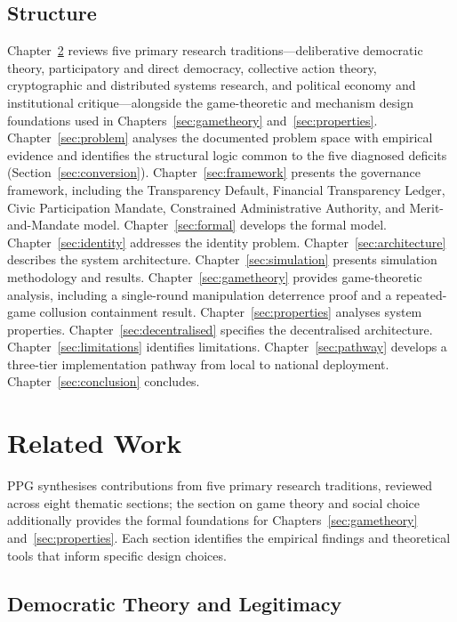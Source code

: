 \documentclass[12pt,a4paper,oneside]{report}
\begin{document}
\section{Structure}

Chapter~\ref{sec:related} reviews five primary research traditions---deliberative democratic theory, participatory and direct democracy, collective action theory, cryptographic and distributed systems research, and political economy and institutional critique---alongside the game-theoretic and mechanism design foundations used in Chapters~\ref{sec:gametheory} and~\ref{sec:properties}. Chapter~\ref{sec:problem} analyses the documented problem space with empirical evidence and identifies the structural logic common to the five diagnosed deficits (Section~\ref{sec:conversion}). Chapter~\ref{sec:framework} presents the governance framework, including the Transparency Default, Financial Transparency Ledger, Civic Participation Mandate, Constrained Administrative Authority, and Merit-and-Mandate model. Chapter~\ref{sec:formal} develops the formal model. Chapter~\ref{sec:identity} addresses the identity problem. Chapter~\ref{sec:architecture} describes the system architecture. Chapter~\ref{sec:simulation} presents simulation methodology and results. Chapter~\ref{sec:gametheory} provides game-theoretic analysis, including a single-round manipulation deterrence proof and a repeated-game collusion containment result. Chapter~\ref{sec:properties} analyses system properties. Chapter~\ref{sec:decentralised} specifies the decentralised architecture. Chapter~\ref{sec:limitations} identifies limitations. Chapter~\ref{sec:pathway} develops a three-tier implementation pathway from local to national deployment. Chapter~\ref{sec:conclusion} concludes.

\chapter{Related Work}
\label{sec:related}

PPG synthesises contributions from five primary research traditions, reviewed across eight thematic sections; the section on game theory and social choice additionally provides the formal foundations for Chapters~\ref{sec:gametheory} and~\ref{sec:properties}. Each section identifies the empirical findings and theoretical tools that inform specific design choices.

\section{Democratic Theory and Legitimacy}
\end{document}
